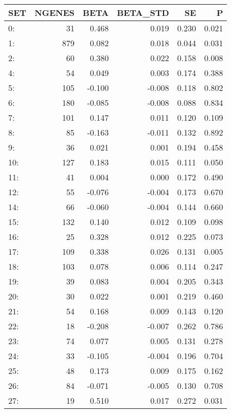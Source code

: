 \begin{table}[ht]
\centering
\begin{tabular}{lrrrrr}
  \hline
SET & NGENES & BETA & BETA\_STD & SE & P \\ 
  \hline
0: &   31 & 0.468 & 0.019 & 0.230 & 0.021 \\ 
  1: &  879 & 0.082 & 0.018 & 0.044 & 0.031 \\ 
  2: &   60 & 0.380 & 0.022 & 0.158 & 0.008 \\ 
  4: &   54 & 0.049 & 0.003 & 0.174 & 0.388 \\ 
  5: &  105 & -0.100 & -0.008 & 0.118 & 0.802 \\ 
  6: &  180 & -0.085 & -0.008 & 0.088 & 0.834 \\ 
  7: &  101 & 0.147 & 0.011 & 0.120 & 0.109 \\ 
  8: &   85 & -0.163 & -0.011 & 0.132 & 0.892 \\ 
  9: &   36 & 0.021 & 0.001 & 0.194 & 0.458 \\ 
  10: &  127 & 0.183 & 0.015 & 0.111 & 0.050 \\ 
  11: &   41 & 0.004 & 0.000 & 0.172 & 0.490 \\ 
  12: &   55 & -0.076 & -0.004 & 0.173 & 0.670 \\ 
  14: &   66 & -0.060 & -0.004 & 0.144 & 0.660 \\ 
  15: &  132 & 0.140 & 0.012 & 0.109 & 0.098 \\ 
  16: &   25 & 0.328 & 0.012 & 0.225 & 0.073 \\ 
  17: &  109 & 0.338 & 0.026 & 0.131 & 0.005 \\ 
  18: &  103 & 0.078 & 0.006 & 0.114 & 0.247 \\ 
  19: &   39 & 0.083 & 0.004 & 0.205 & 0.343 \\ 
  20: &   30 & 0.022 & 0.001 & 0.219 & 0.460 \\ 
  21: &   54 & 0.168 & 0.009 & 0.143 & 0.120 \\ 
  22: &   18 & -0.208 & -0.007 & 0.262 & 0.786 \\ 
  23: &   74 & 0.077 & 0.005 & 0.131 & 0.278 \\ 
  24: &   33 & -0.105 & -0.004 & 0.196 & 0.704 \\ 
  25: &   48 & 0.173 & 0.009 & 0.175 & 0.162 \\ 
  26: &   84 & -0.071 & -0.005 & 0.130 & 0.708 \\ 
  27: &   19 & 0.510 & 0.017 & 0.272 & 0.031 \\ 

\end{tabular}
\end{table}
